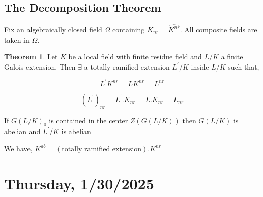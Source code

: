 \documentclass{article}
\theoremstyle{definition}
\newtheorem{theorem}{Theorem}
\numberwithin{theorem}{subsection}
\begin{document}
    \subsection*{The Decomposition Theorem}

    Fix an algebraically closed field \(\Omega\) containing \(K_{nr} = \widehat{K^{nr}}\). All composite fields are taken in \(\Omega\).

    \begin{theorem}
        Let \(K\) be a local field with finite residue field and \(L / K\) a finite Galois extension. Then \(\exists\) a totally ramified extension \(L^{\prime} / K\) inside \(L / K\) such that,

        \[
            L^{\prime} K^{nr} = L K^{nr} = L^{nr}
        \]

        \[
            (L^{\prime})_{nr} = L^{\prime} . K_{nr} = L . K_{nr} = L_{nr} 
        \]

        If \(G(L / K)_0\) is contained in the center \(Z(G(L / K))\) then \(G(L / K)\) is abelian and \(L^{\prime} / K\) is abelian
    \end{theorem}

    We have, \(K^{ab} = (\text{totally ramified extension}) . K^{nr}\)

    \section*{Thursday, 1/30/2025}
    
\end{document}
